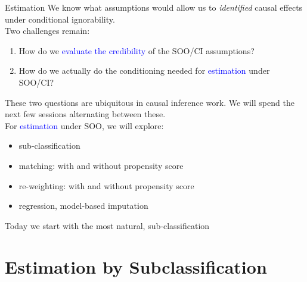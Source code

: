 \documentclass[xcolor=dvipsnames]{beamer}
\begin{document}
\begin{frame}{Estimation}
 We know what assumptions would allow us to \textit{identified} causal effects under conditional ignorability.  \\ 
\medskip Two challenges remain:
\footnotesize
\begin{enumerate}
\item How do we \textcolor{Blue}{evaluate the credibility} of the SOO/CI assumptions?
\item How do we actually do the conditioning needed for  \textcolor{Blue}{estimation} under SOO/CI?
\end{enumerate}
\bigskip 
\small
{} These two questions are ubiquitous in causal inference work. We will spend the next few sessions alternating between these. \\
\bigskip
{} For \textcolor{Blue}{estimation} under SOO, we will explore:
\footnotesize
\begin{itemize}
\item sub-classification
\item matching: with and without propensity score
\item re-weighting: with and without propensity score
\item regression, model-based imputation
\end{itemize}
\medskip
\small
{}  Today we start with the most natural, \alert{sub-classification}
\end{frame}

\section{Estimation by Subclassification}
\end{document}
